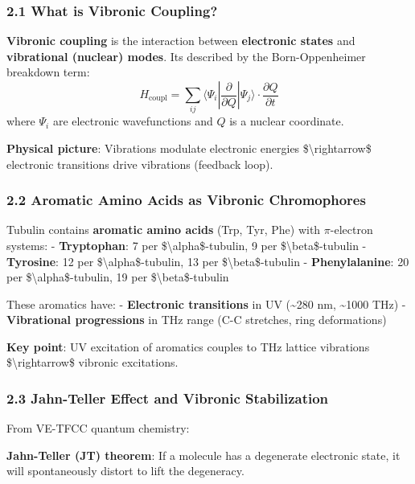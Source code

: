 \subsubsection{2.1 What is Vibronic
Coupling?}\label{what-is-vibronic-coupling}

\textbf{Vibronic coupling} is the interaction between \textbf{electronic
states} and \textbf{vibrational (nuclear) modes}. It\textquotesingle s
described by the Born-Oppenheimer breakdown term:
\[H_{\text{coupl}} = \sum_{ij} \langle \Psi_i | \frac{\partial}{\partial Q} | \Psi_j \rangle \cdot \frac{\partial Q}{\partial t}\]
where \(\Psi_i\) are electronic wavefunctions and \(Q\) is a nuclear
coordinate.

\textbf{Physical picture}: Vibrations modulate electronic energies
\$\textbackslash rightarrow\$ electronic transitions drive vibrations
(feedback loop).

\subsubsection{2.2 Aromatic Amino Acids as Vibronic
Chromophores}\label{aromatic-amino-acids-as-vibronic-chromophores}

Tubulin contains \textbf{aromatic amino acids} (Trp, Tyr, Phe) with
\(\pi\)-electron systems: - \textbf{Tryptophan}: 7 per
\$\textbackslash alpha\$-tubulin, 9 per \$\textbackslash beta\$-tubulin
- \textbf{Tyrosine}: 12 per \$\textbackslash alpha\$-tubulin, 13 per
\$\textbackslash beta\$-tubulin - \textbf{Phenylalanine}: 20 per
\$\textbackslash alpha\$-tubulin, 19 per \$\textbackslash beta\$-tubulin

These aromatics have: - \textbf{Electronic transitions} in UV
(\textasciitilde280 nm, \textasciitilde1000 THz) - \textbf{Vibrational
progressions} in THz range (C-C stretches, ring deformations)

\textbf{Key point}: UV excitation of aromatics couples to THz lattice
vibrations \$\textbackslash rightarrow\$ vibronic excitations.

\subsubsection{2.3 Jahn-Teller Effect and Vibronic
Stabilization}\label{jahn-teller-effect-and-vibronic-stabilization}

From VE-TFCC quantum chemistry:

\textbf{Jahn-Teller (JT) theorem}: If a molecule has a degenerate
electronic state, it will spontaneously distort to lift the degeneracy.

